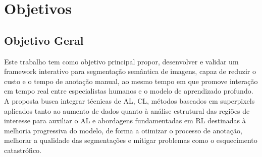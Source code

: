 



\section{Objetivos}

\subsection{Objetivo Geral}


Este trabalho tem como objetivo principal propor, desenvolver e validar um framework interativo para segmentação semântica de imagens, capaz de reduzir o custo e o tempo de anotação manual, ao mesmo tempo em que promove interação em tempo real entre especialistas humanos e o modelo de aprendizado profundo. A proposta busca integrar técnicas de \ac{AL}, \ac{CL}, métodos baseados em superpixels aplicados tanto ao aumento de dados quanto à análise estrutural das regiões de interesse para auxiliar o \ac{AL} e abordagens fundamentadas em \ac{RL} destinadas à melhoria progressiva do modelo, de forma a otimizar o processo de anotação, melhorar a qualidade das segmentações e mitigar problemas como o esquecimento catastrófico.


